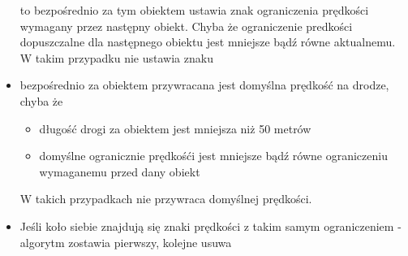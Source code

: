 \begin{itemize}
\begin{itemize}
\end{itemize}
to bezpośrednio za tym obiektem ustawia znak ograniczenia prędkości wymagany przez następny obiekt. Chyba że ograniczenie predkości dopuszczalne dla następnego obiektu jest mniejsze bądź równe aktualnemu. W takim przypadku nie ustawia znaku
\item bezpośrednio za obiektem przywracana jest domyślna prędkość na drodze, chyba że 
\begin{itemize}
\item długość drogi za obiektem jest mniejsza niż 50 metrów
\item domyślne ogranicznie prędkośći jest mniejsze bądź równe ograniczeniu wymaganemu przed dany obiekt
\end{itemize}
W takich przypadkach nie przywraca domyślnej prędkości.
\item Jeśli koło siebie znajdują się znaki prędkości z takim samym ograniczeniem - algorytm zostawia pierwszy, kolejne usuwa
\end{itemize}



